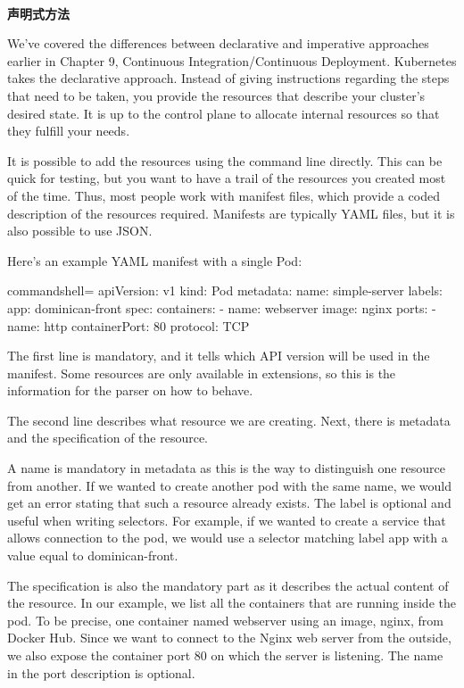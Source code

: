 \hspace*{\fill} \\ %
\noindent
\textbf{声明式方法}

We've covered the differences between declarative and imperative approaches earlier in Chapter 9, Continuous Integration/Continuous Deployment. Kubernetes takes the  declarative approach. Instead of giving instructions regarding the steps that need to be taken, you provide the resources that describe your cluster's desired state. It is up to the control plane to allocate internal resources so that they fulfill your needs.

It is possible to add the resources using the command line directly. This can be quick for testing, but you want to have a trail of the resources you created most of the time. Thus, most people work with manifest files, which provide a coded description of the resources required. Manifests are typically YAML files, but it is also possible to use JSON.

Here's an example YAML manifest with a single Pod:

\begin{tcblisting}{commandshell={}}
apiVersion: v1
kind: Pod
metadata:
  name: simple-server
  labels:
    app: dominican-front
spec:
  containers:
    - name: webserver
      image: nginx
      ports:
        - name: http
          containerPort: 80
          protocol: TCP
\end{tcblisting}

The first line is mandatory, and it tells which API version will be used in the manifest. Some resources are only available in extensions, so this is the information for the parser on how to behave. 

The second line describes what resource we are creating. Next, there is metadata and the specification of the resource.

A name is mandatory in metadata as this is the way to distinguish one resource from another. If we wanted to create another pod with the same name, we would get an error stating that such a resource already exists. The label is optional and useful when writing selectors. For example, if we wanted to create a service that allows connection to the pod, we would use a selector matching label app with a value equal to dominican-front.

The specification is also the mandatory part as it describes the actual content of the resource. In our example, we list all the containers that are running inside the pod. To be precise, one container named webserver using an image, nginx, from Docker Hub. Since we want to connect to the Nginx web server from the outside, we also expose the container port 80 on which the server is listening. The name in the port description is optional.

